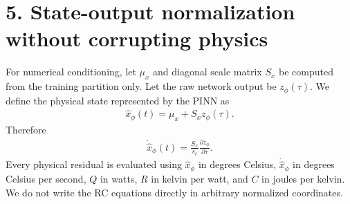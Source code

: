 \documentclass[11pt]{article}
\begin{document}
\section*{5. State-output normalization without corrupting physics}
For numerical conditioning, let \(\mu_x\) and diagonal scale matrix \(S_x\) be computed from the training partition only. Let the raw network output be \(z_\phi(\tau)\). We define the physical state represented by the PINN as
\begin{align}
\boxed{\widehat x_\phi(t)=\mu_x+S_xz_\phi(\tau).}
\tag{P2.9}
\end{align}
Therefore
\begin{align}
\boxed{\dot{\widehat x}_\phi(t)=\frac{S_x}{s_t}\frac{\partial z_\phi}{\partial\tau}.}
\tag{P2.10}
\end{align}
Every physical residual is evaluated using \(\widehat x_\phi\) in degrees Celsius, \(\dot{\widehat x}_\phi\) in degrees Celsius per second, \(Q\) in watts, \(R\) in kelvin per watt, and \(C\) in joules per kelvin. We do not write the RC equations directly in arbitrary normalized coordinates.
\end{document}
